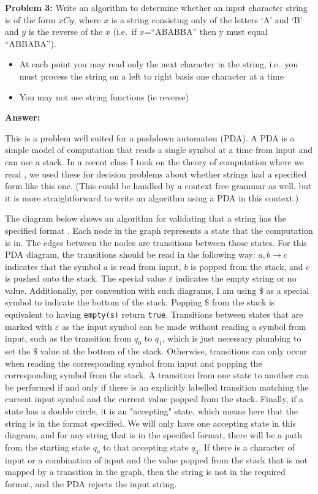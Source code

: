 \documentclass[12pt,letterpaper,final]{report}
\begin{document}
\pagebreak
\noindent\textbf{Problem 3:}
Write an algorithm to determine whether an input character string is of the form $xCy$, where $x$ is a string consisting only of the letters `A' and `B' and $y$ is the reverse of the $x$ (i.e.\ if $x$=``ABABBA'' then y must equal ``ABBABA'').
\begin{itemize}
  \item At each point you may read only the next character in the string, i.e.\ you must process the string on a left to right basis one character at a time
  \item You may not use string functions (ie reverse)
\end{itemize}

\noindent\textbf{Answer:}

This is a problem well suited for a pushdown automaton (PDA). A PDA is a simple model of computation that reads a single symbol at a time from input and can use a stack. In a recent class I took on the theory of computation where we read \cite{sipser2013}, we used these for decision problems about whether strings had a specified form like this one. (This could be handled by a context free grammar as well, but it is more straightforward to write an algorithm using a PDA in this context.)

The diagram below shows an algorithm for validating that a string has the specified format . Each node in the graph represents a state that the computation is in. The edges between the nodes are transitions between those states. For this PDA diagram, the transitions should be read in the following way: $a, b \to c$ indicates that the symbol $a$ is read from input, $b$ is popped from the stack, and $c$ is pushed onto the stack. The special value $\varepsilon$ indicates the empty string or no value. Additionally, per convention with such diagrams, I am using $\$$ as a special symbol to indicate the bottom of the stack. Popping $\$$ from the stack is equivalent to having \verb|empty(s)| return \verb|true|. Transitions between states that are marked with $\varepsilon$ as the input symbol can be made without reading a symbol from input, such as the transition from $q_0$ to $q_1$, which is just necessary plumbing to set the $\$$ value at the bottom of the stack. Otherwise, transitions can only occur when reading the corresponding symbol from input and popping the corresponding symbol from the stack. A transition from one state to another can be performed if and only if there is an explicitly labelled transition matching the current input symbol and the current value popped from the stack. Finally, if a state has a double circle, it is an "accepting" state, which means here that the string is in the format specified. We will only have one accepting state in this diagram, and for any string that is in the specified format, there will be a path from the starting state $q_0$ to that accepting state $q_3$. If there is a character of input or a combination of input and the value popped from the stack that is not mapped by a transition in the graph, then the string is not in the required format, and the PDA rejects the input string.
\end{document}
